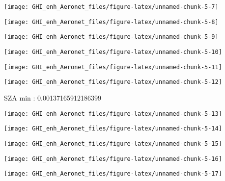 \documentclass[
  10pt,
  a4paper,oneside]{article}
\begin{document}
\begin{center}\texttt{[image: GHI\_enh\_Aeronet\_files/figure-latex/unnamed-chunk-5-7]} \end{center}

\begin{center}\texttt{[image: GHI\_enh\_Aeronet\_files/figure-latex/unnamed-chunk-5-8]} \end{center}

\begin{center}\texttt{[image: GHI\_enh\_Aeronet\_files/figure-latex/unnamed-chunk-5-9]} \end{center}

\begin{center}\texttt{[image: GHI\_enh\_Aeronet\_files/figure-latex/unnamed-chunk-5-10]} \end{center}

\begin{center}\texttt{[image: GHI\_enh\_Aeronet\_files/figure-latex/unnamed-chunk-5-11]} \end{center}

\begin{center}\texttt{[image: GHI\_enh\_Aeronet\_files/figure-latex/unnamed-chunk-5-12]} \end{center}

SZA min : 0.00137165912186399

\begin{center}\texttt{[image: GHI\_enh\_Aeronet\_files/figure-latex/unnamed-chunk-5-13]} \end{center}

\begin{center}\texttt{[image: GHI\_enh\_Aeronet\_files/figure-latex/unnamed-chunk-5-14]} \end{center}

\begin{center}\texttt{[image: GHI\_enh\_Aeronet\_files/figure-latex/unnamed-chunk-5-15]} \end{center}

\begin{center}\texttt{[image: GHI\_enh\_Aeronet\_files/figure-latex/unnamed-chunk-5-16]} \end{center}

\begin{center}\texttt{[image: GHI\_enh\_Aeronet\_files/figure-latex/unnamed-chunk-5-17]} \end{center}
\end{document}
